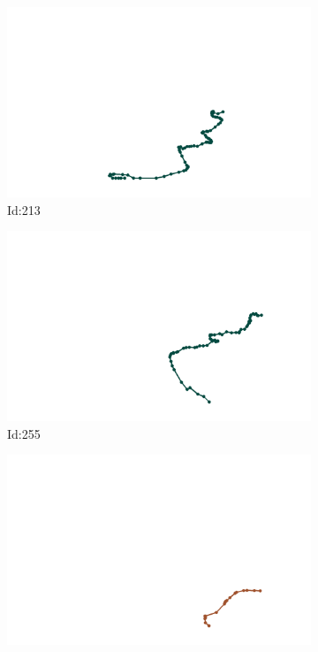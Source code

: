 \documentclass[12pt,twoside]{report}
\begin{document}
\begin{figure}
\centering
\begin{subfigure}[b]{0.20\textwidth}
\centering
\includegraphics[width=\textwidth]{../../trajectories/213.png}
\caption{Id:213}
\end{subfigure}
\begin{subfigure}[b]{0.20\textwidth}
\centering
\includegraphics[width=\textwidth]{../../trajectories/255.png}
\caption{Id:255}
\end{subfigure}
\begin{subfigure}[b]{0.20\textwidth}
\centering
\includegraphics[width=\textwidth]{../../trajectories/516.png}

\end{subfigure}
\end{figure}
\end{document}
